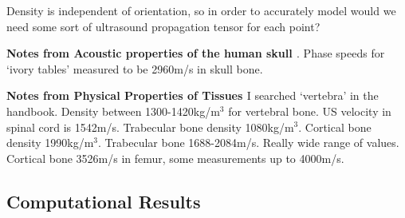 \documentclass[11pt,titlepage]{article} %
\begin{document}
Density is independent of orientation, so in order to accurately model would we need some sort of ultrasound propagation tensor for each point? 

\textbf{Notes from Acoustic properties of the human skull \cite{ fry1978acoustical}}.
Phase speeds for `ivory tables' measured to be 2960m/s in skull bone.

\textbf{Notes from Physical Properties of Tissues \cite{duck1990physical}}
I searched `vertebra' in the handbook. Density between 1300-1420kg/m$^3$ for vertebral bone. US velocity in spinal cord is 1542m/s. Trabecular bone density 1080kg/m$^3$. Cortical bone density 1990kg/m$^3$. Trabecular bone 1688-2084m/s. Really wide range of values. Cortical bone 3526m/s in femur, some measurements up to 4000m/s.


\subsection{Computational Results}
\end{document}
